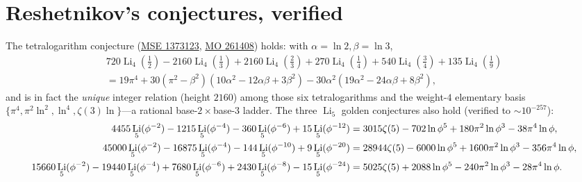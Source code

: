 \documentclass[11pt]{article}
\DeclareMathOperator{\Li}{Li}
\newcommand{\lp}{\ln\phi}
\theoremstyle{plain}\newtheorem{theorem}{Theorem}\newtheorem{proposition}[theorem]{Proposition}
\theoremstyle{remark}\newtheorem{remark}[theorem]{Remark}
\begin{document}
\section{Reshetnikov's conjectures, verified}
The tetralogarithm conjecture (\href{https://math.stackexchange.com/q/1373123}{MSE 1373123},
\href{https://mathoverflow.net/q/261408}{MO 261408}) holds: with $\alpha=\ln2,\beta=\ln3$,
\begin{multline}\label{eq:tetra}
  720\Li_4(\tfrac12)-2160\Li_4(\tfrac13)+2160\Li_4(\tfrac23)+270\Li_4(\tfrac14)+540\Li_4(\tfrac34)+135\Li_4(\tfrac19)\\
  =19\pi^4+30(\pi^2-\beta^2)(10\alpha^2-12\alpha\beta+3\beta^2)-30\alpha^2(19\alpha^2-24\alpha\beta+8\beta^2),
\end{multline}
and is in fact the \emph{unique} integer relation (height $2160$) among those six tetralogarithms and the
weight-$4$ elementary basis $\{\pi^4,\pi^2\ln^2,\ln^4,\zeta(3)\ln\}$---a rational base-$2\times$base-$3$ ladder.
The three $\Li_5$ golden conjectures also hold (verified to $\sim10^{-257}$):
{\scriptsize
\begin{align}
  4455\Li_5(\phi^{-2})-1215\Li_5(\phi^{-4})-360\Li_5(\phi^{-6})+15\Li_5(\phi^{-12})
  &=3015\zeta(5)-702\lp^5+180\pi^2\lp^3-38\pi^4\lp,\notag\\
  45000\Li_5(\phi^{-2})-16875\Li_5(\phi^{-4})-144\Li_5(\phi^{-10})+9\Li_5(\phi^{-20})
  &=28944\zeta(5)-6000\lp^5+1600\pi^2\lp^3-356\pi^4\lp,\notag\\
  15660\Li_5(\phi^{-2})-19440\Li_5(\phi^{-4})+7680\Li_5(\phi^{-6})+2430\Li_5(\phi^{-8})-15\Li_5(\phi^{-24})
  &=5025\zeta(5)+2088\lp^5-240\pi^2\lp^3-28\pi^4\lp.\notag
\end{align}}
\end{document}
